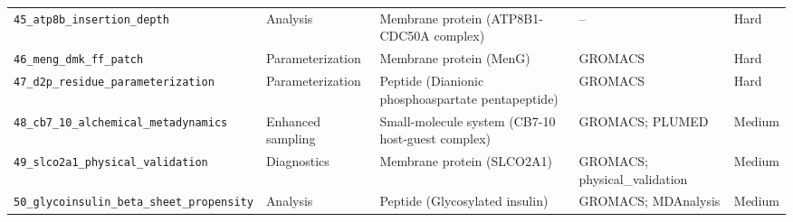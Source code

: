 \documentclass[11pt,a4paper]{article}
\begin{document}
\begin{longtable}{@{}L{0.19\textwidth}L{0.15\textwidth}L{0.29\textwidth}L{0.24\textwidth}L{0.09\textwidth}@{}}
\texttt{45\_\allowbreak{}atp8b\_\allowbreak{}insertion\_\allowbreak{}depth} & Analysis & Membrane protein (ATP8B1-CDC50A complex) & -- & Hard \\
\texttt{46\_\allowbreak{}meng\_\allowbreak{}dmk\_\allowbreak{}ff\_\allowbreak{}patch} & Parameterization & Membrane protein (MenG) & GROMACS & Hard \\
\texttt{47\_\allowbreak{}d2p\_\allowbreak{}residue\_\allowbreak{}parameterization} & Parameterization & Peptide (Dianionic phosphoaspartate pentapeptide) & GROMACS & Hard \\
\texttt{48\_\allowbreak{}cb7\_\allowbreak{}10\_\allowbreak{}alchemical\_\allowbreak{}metadynamics} & Enhanced sampling & Small-molecule system (CB7-10 host-guest complex) & GROMACS; \allowbreak{}PLUMED & Medium \\
\texttt{49\_\allowbreak{}slco2a1\_\allowbreak{}physical\_\allowbreak{}validation} & Diagnostics & Membrane protein (SLCO2A1) & GROMACS; \allowbreak{}physical\_validation & Medium \\
\texttt{50\_\allowbreak{}glycoinsulin\_\allowbreak{}beta\_\allowbreak{}sheet\_\allowbreak{}propensity} & Analysis & Peptide (Glycosylated insulin) & GROMACS; \allowbreak{}MDAnalysis & Medium \\
\end{longtable}
\endgroup
\clearpage
\end{document}
